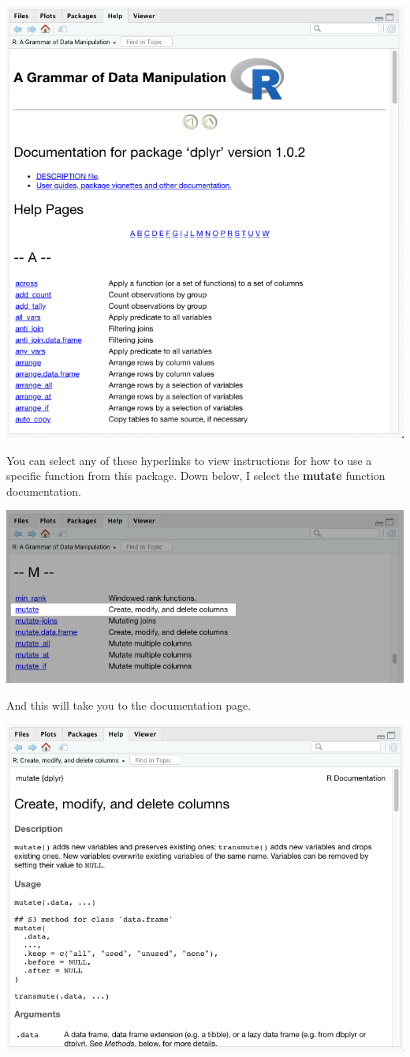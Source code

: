 \documentclass[
]{book}
\begin{document}
\begin{center}
\begin{center}\includegraphics[width=0.6\linewidth]{1.44_Package_Documentation} \end{center}

You can select any of these hyperlinks to view instructions for how to use a specific function from this package. Down below, I select the \textbf{mutate} function documentation.

\begin{center}\includegraphics[width=0.6\linewidth]{1.45_Select_Mutate_Documentation} \end{center}

And this will take you to the documentation page.

\begin{center}\includegraphics[width=0.6\linewidth]{1.46_Mutate_Documentation} \end{center}


\end{center}
\end{document}
